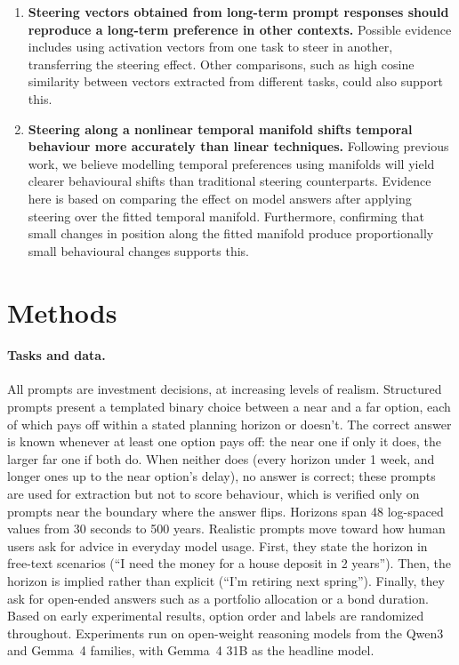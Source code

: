 \documentclass[midterm]{sparreport}
\begin{document}
\begin{enumerate}
  \item \textbf{Steering vectors obtained from long-term prompt responses should reproduce a long-term preference in other contexts.} Possible evidence includes using activation vectors from one task to steer in another, transferring the steering effect. Other comparisons, such as high cosine similarity between vectors extracted from different tasks, could also support this.
  \item \textbf{Steering along a nonlinear temporal manifold shifts temporal behaviour more accurately than linear techniques.} Following previous work, we believe modelling temporal preferences using manifolds will yield clearer behavioural shifts than traditional steering counterparts. Evidence here is based on comparing the effect on model answers after applying steering over the fitted temporal manifold. Furthermore, confirming that small changes in position along the fitted manifold produce proportionally small behavioural changes supports this.
\end{enumerate}

\section{Methods}

\paragraph{Tasks and data.} All prompts are investment decisions, at increasing levels of realism. Structured prompts present a templated binary choice between a near and a far option, each of which pays off within a stated planning horizon or doesn't. The correct answer is known whenever at least one option pays off: the near one if only it does, the larger far one if both do. When neither does (every horizon under 1 week, and longer ones up to the near option's delay), no answer is correct; these prompts are used for extraction but not to score behaviour, which is verified only on prompts near the boundary where the answer flips. Horizons span 48 log-spaced values from 30 seconds to 500 years. Realistic prompts move toward how human users ask for advice in everyday model usage. First, they state the horizon in free-text scenarios (``I need the money for a house deposit in 2 years''). Then, the horizon is implied rather than explicit (``I'm retiring next spring''). Finally, they ask for open-ended answers such as a portfolio allocation or a bond duration. Based on early experimental results, option order and labels are randomized throughout. Experiments run on open-weight reasoning models from the Qwen3 and Gemma~4 families, with Gemma~4 31B as the headline model.
\end{document}
